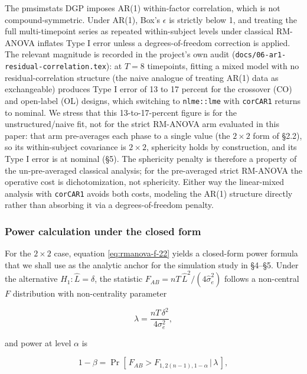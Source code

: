 \documentclass[
  11pt,
]{article}
\begin{document}
The pmsimstats DGP imposes AR(1) within-factor correlation, which
is not compound-symmetric. Under AR(1), Box's \(\epsilon\) is
strictly below 1, and treating the full multi-timepoint series as
repeated within-subject levels under classical RM-ANOVA inflates
Type I error unless a degrees-of-freedom correction is applied.
The relevant magnitude is recorded in the project's own audit
(\texttt{docs/06-ar1-residual-correlation.tex}): at \(T = 8\) timepoints,
fitting a mixed model with no residual-correlation structure (the
naive analogue of treating AR(1) data as exchangeable) produces
Type I error of 13 to 17 percent for the crossover (CO) and
open-label (OL) designs, which switching to \texttt{nlme::lme} with
\texttt{corCAR1} returns to nominal. We stress that this 13-to-17-percent
figure is for the unstructured/naive fit, not for the strict
RM-ANOVA arm evaluated in this paper: that arm pre-averages each
phase to a single value (the \(2 \times 2\) form of \S2.2), so its
within-subject covariance is \(2 \times 2\), sphericity holds by
construction, and its Type I error is at nominal (\S5). The
sphericity penalty is therefore a property of the un-pre-averaged
classical analysis; for the pre-averaged strict RM-ANOVA the
operative cost is dichotomization, not sphericity. Either way the
linear-mixed analysis with \texttt{corCAR1} avoids both costs, modeling
the AR(1) structure directly rather than absorbing it via a
degrees-of-freedom penalty.

\subsubsection{Power calculation under the closed form}\label{power-calculation-under-the-closed-form}

For the \(2 \times 2\) case, equation \eqref{eq:rmanova-f-22} yields
a closed-form power formula that we shall use as the analytic
anchor for the simulation study in \S4--\S5. Under the
alternative \(H_1: \hat L = \delta\), the statistic
\(F_{AB} = nT\,\hat L^2 / (4\hat\sigma_e^2)\) follows a
non-central \(F\) distribution with non-centrality parameter

\begin{equation}
\lambda = \frac{nT\,\delta^2}{4\sigma_e^2} ,
\label{eq:rmanova-ncp}
\end{equation}

and power at level \(\alpha\) is

\begin{equation}
1 - \beta = \Pr\!\left[\, F_{AB} > F_{1, 2(n-1), 1-\alpha}
\,\big|\, \lambda \,\right] ,
\label{eq:rmanova-power}
\end{equation}
\end{document}

